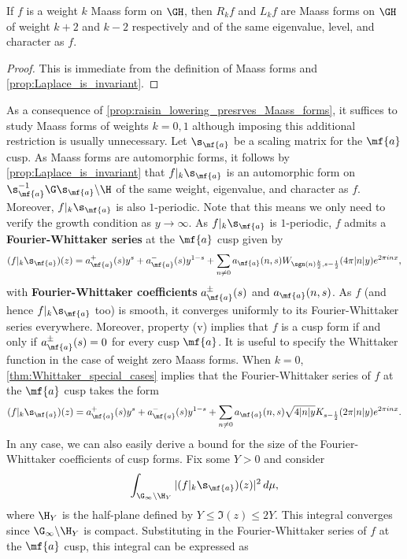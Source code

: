     \begin{proposition}\label{prop:raisin_lowering_presrves_Maass_forms}
      If $f$ is a weight $k$ Maass form on $\GH$, then $R_{k}f$ and $L_{k}f$ are Maass forms on $\GH$ of weight $k+2$ and $k-2$ respectively and of the same eigenvalue, level, and character as $f$.
    \end{proposition}
    \begin{proof}
      This is immediate from the definition of Maass forms and \cref{prop:Laplace_is_invariant}.
    \end{proof}
  
    As a consequence of \cref{prop:raisin_lowering_presrves_Maass_forms}, it suffices to study Maass forms of weights $k = 0,1$ although imposing this additional restriction is usually unnecessary. Let $\s_{\mf{a}}$ be a scaling matrix for the $\mf{a}$ cusp. As Maass forms are automorphic forms, it follows by \cref{prop:Laplace_is_invariant} that $f|_{k}\s_{\mf{a}}$ is an automorphic form on $\s_{\mf{a}}^{-1}\G\s_{\mf{a}}\backslash\H$ of the same weight, eigenvalue, and character as $f$. Moreover, $f|_{k}\s_{\mf{a}}$ is also $1$-periodic. Note that this means we only need to verify the growth condition as $y \to \infty$. As $f|_{k}\s_{\mf{a}}$ is $1$-periodic, $f$ admits a \textbf{Fourier-Whittaker series} at the $\mf{a}$ cusp given by
    \[
      (f|_{k}\s_{\mf{a}})(z) = a_{\mf{a}}^{+}(s)y^{s}+a_{\mf{a}}^{-}(s)y^{1-s}+\sum_{n \neq 0}a_{\mf{a}}(n,s)W_{\sgn(n)\frac{k}{2},s-\frac{1}{2}}(4\pi|n|y)e^{2\pi inx},
    \]
    with \textbf{Fourier-Whittaker coefficients} $a_{\mf{a}}^{\pm}(s)$ and $a_{\mf{a}}(n,s)$. As $f$ (and hence $f|_{k}\s_{\mf{a}}$ too) is smooth, it converges uniformly to its Fourier-Whittaker series everywhere. Moreover, property (v) implies that $f$ is a cusp form if and only if $a_{\mf{a}}^{\pm}(s) = 0$ for every cusp $\mf{a}$. It is useful to specify the Whittaker function in the case of weight zero Maass forms. When $k = 0$, \cref{thm:Whittaker_special_cases} implies that the Fourier-Whittaker series of $f$ at the $\mf{a}$ cusp takes the form
    \[
      (f|_{k}\s_{\mf{a}})(z) = a_{\mf{a}}^{+}(s)y^{s}+a_{\mf{a}}^{-}(s)y^{1-s}+\sum_{n \neq 0}a_{\mf{a}}(n,s)\sqrt{4|n|y}K_{s-\frac{1}{2}}(2\pi|n|y)e^{2\pi inx}.
    \]
    In any case, we can also easily derive a bound for the size of the Fourier-Whittaker coefficients of cusp forms. Fix some $Y > 0$ and consider
    \[
      \int_{\G_{\infty}\backslash\H_{Y}}|(f|_{k}\s_{\mf{a}})(z)|^{2}\,d\mu,
    \]
    where $\H_{Y}$ is the half-plane defined by $Y \le \Im(z) \le 2Y$. This integral converges since $\G_{\infty}\backslash\H_{Y}$ is compact. Substituting in the Fourier-Whittaker series of $f$ at the $\mf{a}$ cusp, this integral can be expressed as
